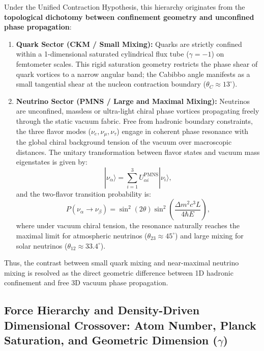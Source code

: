 Under the Unified Contraction Hypothesis, this hierarchy originates from the \textbf{topological dichotomy between confinement geometry and unconfined phase propagation}:
\begin{enumerate}
    \item \textbf{Quark Sector (CKM / Small Mixing):} Quarks are strictly confined within a 1-dimensional saturated cylindrical flux tube ($\gamma = -1$) on femtometer scales. This rigid saturation geometry restricts the phase shear of quark vortices to a narrow angular band; the Cabibbo angle manifests as a small tangential shear at the nucleon contraction boundary ($\theta_C \approx 13^\circ$).
    \item \textbf{Neutrino Sector (PMNS / Large and Maximal Mixing):} Neutrinos are unconfined, massless or ultra-light chiral phase vortices propagating freely through the static vacuum fabric. Free from hadronic boundary constraints, the three flavor modes ($\nu_e, \nu_\mu, \nu_\tau$) engage in coherent phase resonance with the global chiral background tension of the vacuum over macroscopic distances. The unitary transformation between flavor states and vacuum mass eigenstates is given by:
          \begin{equation}
              |\nu_\alpha\rangle = \sum_{i=1}^3 U_{\alpha i}^{\mathrm{PMNS}} |\nu_i\rangle,
              \label{eq:pmns_donusum}
          \end{equation}
          and the two-flavor transition probability is:
          \begin{equation}
              P(\nu_\alpha \to \nu_\beta) = \sin^2(2\theta) \sin^2\left( \frac{\Delta m^2 c^3 L}{4 \hbar E} \right),
              \label{eq:notrino_salinim}
          \end{equation}
          where under vacuum chiral tension, the resonance naturally reaches the maximal limit for atmospheric neutrinos ($\theta_{23} \approx 45^\circ$) and large mixing for solar neutrinos ($\theta_{12} \approx 33.4^\circ$).
\end{enumerate}
Thus, the contrast between small quark mixing and near-maximal neutrino mixing is resolved as the direct geometric difference between 1D hadronic confinement and free 3D vacuum phase propagation.

\subsection{Force Hierarchy and Density-Driven Dimensional Crossover: Atom Number, Planck Saturation, and Geometric Dimension (\texorpdfstring{$\gamma$}{gamma})}
\label{sec:boyutsal_gecis_main}

